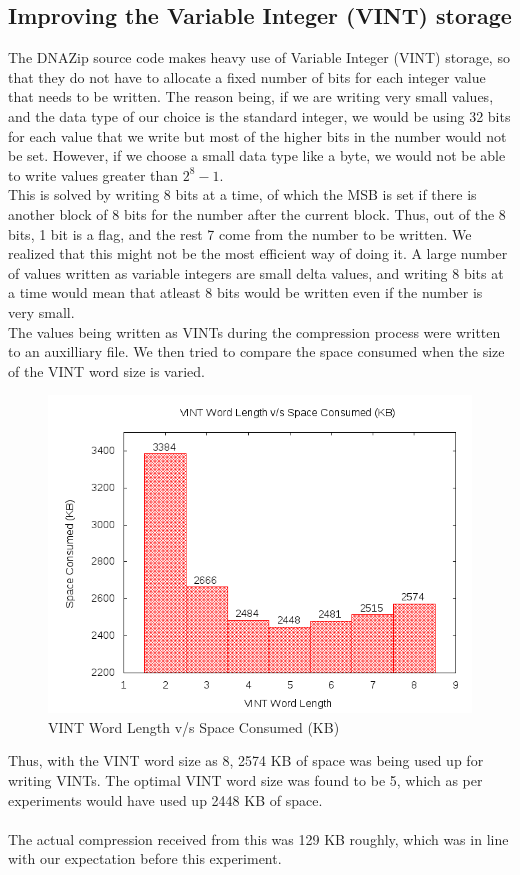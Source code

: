 \documentclass{article}
\begin{document}
\subsection {Improving the Variable Integer (VINT) storage}
The DNAZip source code makes heavy use of Variable Integer (VINT) storage, so
that they do not have to allocate a fixed number of bits for each integer value
that needs to be written. The reason being, if we are writing very small values,
and the data type of our choice is the standard integer, we would be using 32
bits for each value that we write but most of the higher bits in the number
would not be set. However, if we choose a small data type like a byte, we would
not be able to write values greater than $2^8 - 1$. \\
This is solved by writing 8 bits at a time, of which the MSB is set if there is
another block of 8 bits for the number after the current block. Thus, out of the
8 bits, 1 bit is a flag, and the rest 7 come from the number to be written. We
realized that this might not be the most efficient way of doing it. A large
number of values written as variable integers are small delta values, and
writing 8 bits at a time would mean that atleast 8 bits would be written even if
the number is very small. \\
The values being written as VINTs during the compression process were written to
an auxilliary file. We then tried to compare the space consumed when the size of
the VINT word size is varied. 

\begin{figure}[htp]
\centering
\includegraphics[scale=0.4]{images/VINT.png}
\caption{VINT Word Length v/s Space Consumed (KB)}\label{fig:fs}
\end{figure}
\clearpage
Thus, with the VINT word size as 8, 2574 KB of space was being used up for
writing VINTs. The optimal VINT word size was found to be 5, which as per
experiments would have used up 2448 KB of space.\\
\\ 
The actual compression received from this was 129 KB roughly, which was in line
with our expectation before this experiment.\\
\clearpage
\end{document}
